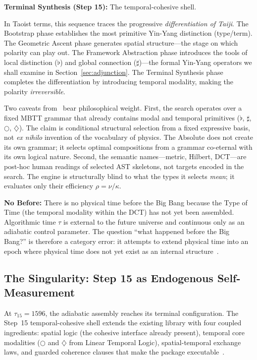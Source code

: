 \documentclass[12pt,a4paper]{article}
\newcommand{\nextmod}{\bigcirc}
\newcommand{\diam}{\diamondsuit}
\newcommand{\flatmod}{\flat}
\newcommand{\sharpmod}{\sharp}
\begin{document}
\textbf{Terminal Synthesis (Step 15):} The temporal-cohesive shell.

In Taoist terms, this sequence traces the progressive \emph{differentiation of Taiji}. The Bootstrap phase establishes the most primitive Yin-Yang distinction (type/term). The Geometric Ascent phase generates spatial structure---the stage on which polarity can play out. The Framework Abstraction phase introduces the tools of local distinction ($\flatmod$) and global connection ($\sharpmod$)---the formal Yin-Yang operators we shall examine in Section~\ref{sec:adjunction}. The Terminal Synthesis phase completes the differentiation by introducing temporal modality, making the polarity \emph{irreversible}.

Two caveats from~\cite{pen1} bear philosophical weight. First, the search operates over a fixed MBTT grammar that already contains modal and temporal primitives ($\flatmod$, $\sharpmod$, $\nextmod$, $\diam$). The claim is conditional structural selection from a fixed expressive basis, not \emph{ex nihilo} invention of the vocabulary of physics. The Absolute does not create its own grammar; it selects optimal compositions from a grammar co-eternal with its own logical nature. Second, the semantic names---metric, Hilbert, DCT---are post-hoc human readings of selected AST skeletons, not targets encoded in the search. The engine is structurally blind to what the types it selects \emph{mean}; it evaluates only their efficiency $\rho = \nu/\kappa$.

\textbf{No Before:} There is no physical time before the Big Bang because the Type of Time (the temporal modality within the DCT) has not yet been assembled. Algorithmic time $\tau$ is external to the future universe and continuous only as an adiabatic control parameter. The question ``what happened before the Big Bang?'' is therefore a category error: it attempts to extend physical time into an epoch where physical time does not yet exist as an internal structure~\cite{pen2}.


\subsection{The Singularity: Step 15 as Endogenous Self-Measurement}
\label{sec:singularity}

At $\tau_{15} = 1596$, the adiabatic assembly reaches its terminal configuration. The Step~15 temporal-cohesive shell extends the existing library with four coupled ingredients: spatial logic (the cohesive interface already present), temporal core modalities ($\nextmod$ and $\diam$ from Linear Temporal Logic), spatial-temporal exchange laws, and guarded coherence clauses that make the package executable~\cite{pen1}.
\end{document}
